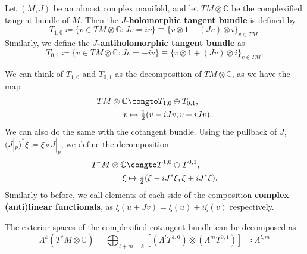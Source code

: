\documentclass[11pt, final]{article}
\begin{document}
\begin{definition}
	Let $(M,J)$ be an almost complex manifold, and let $TM \otimes \mathbb{C}$ be the complexified tangent bundle of $M$. Then the \textbf{$J$-holomorphic tangent bundle} is defined by
		\begin{equation}
			T_{1,0} \coloneqq\{ v \in TM \otimes \mathbb{C} : Jv = iv\} \equiv \{ v \otimes 1 - (Jv) \otimes i\}_{v \in TM}.
		\end{equation}
	Similarly, we define the \textbf{$J$-antiholomorphic tangent bundle} as
		\begin{equation}
			T_{0,1} \coloneqq\{ v \in TM \otimes \mathbb{C} : Jv = -iv\} \equiv \{ v \otimes 1 + (Jv) \otimes i\}_{v \in TM}.
		\end{equation}
\end{definition}
\begin{remark}
	We can think of $T_{1,0}$ and $T_{0,1}$ as the decomposition of $TM \otimes \mathbb{C}$, as we have the map
		\begin{align*}
			TM \otimes \mathbb{C} &\congto T_{1,0} \oplus T_{0,1},\\
			v & \mapsto \tfrac{1}{2} (v - iJv, v+iJv).
		\end{align*}
	We can also do the same with the cotangent bundle. Using the pullback of $J$, ${(J|_p)^* \xi \coloneqq \xi \circ J|_p}$, we define the decomposition
		\begin{align*}
			T^*M \otimes \mathbb{C} &\congto T^{1,0} \oplus T^{0,1},\\
			\xi & \mapsto \tfrac{1}{2} (\xi - iJ^*\xi, \xi+iJ^*\xi).
		\end{align*}
	Similarly to before, we call elements of each side of the composition \textbf{complex (anti)linear functionals}, as $\xi( u + Jv) = \xi(u) \pm i\xi(v)$ respectively.
\end{remark}

\begin{prop}\label{prop:extDecomp}
	The exterior spaces of the complexified cotangent bundle can be decomposed as
		\begin{equation}
			\Lambda^k\left( T^*M \otimes \mathbb{C} \right) = \bigoplus_{l+m =k} \left[ \left( \Lambda^l T^{1,0} \right) \otimes \left( \Lambda^m T^{0,1} \right) \right] \eqqcolon \Lambda^{l,m}
		\end{equation}
\end{prop}
\end{document}
